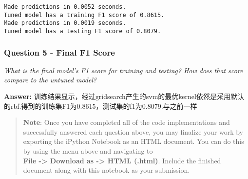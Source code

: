 \documentclass{ctexart}
\begin{document}
    \begin{Verbatim}[commandchars=\\\{\}]
Made predictions in 0.0052 seconds.
Tuned model has a training F1 score of 0.8615.
Made predictions in 0.0019 seconds.
Tuned model has a testing F1 score of 0.8079.
    \end{Verbatim}

    \subsubsection{Question 5 - Final F1
Score}\label{question-5---final-f1-score}

\emph{What is the final model's F1 score for training and testing? How
does that score compare to the untuned model?}

    \textbf{Answer: }
训练结果显示，经过gridsearch产生的svm的最优kernel依然是采用默认的rbf.得到的训练集F1为0.8615，测试集的f1为0.8079.与之前一样

    \begin{quote}
\textbf{Note}: Once you have completed all of the code implementations
and successfully answered each question above, you may finalize your
work by exporting the iPython Notebook as an HTML document. You can do
this by using the menu above and navigating to\\
\textbf{File -\textgreater{} Download as -\textgreater{} HTML (.html)}.
Include the finished document along with this notebook as your
submission.
\end{quote}


    
    
    
    
\end{document}
